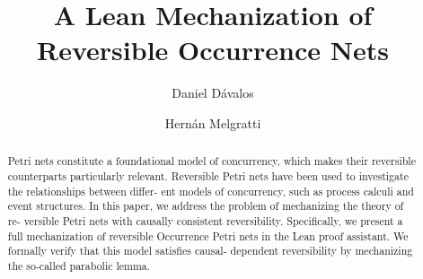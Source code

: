 \documentclass{report}
\title{A Lean Mechanization of Reversible Occurrence Nets}
\author{Daniel Dávalos}
\author{Hernán Melgratti}
\begin{document}
\maketitle

\begin{abstract}
Petri nets constitute a foundational model of concurrency,
which makes their reversible counterparts particularly relevant. Reversible
Petri nets have been used to investigate the relationships between differ-
ent models of concurrency, such as process calculi and event structures.
In this paper, we address the problem of mechanizing the theory of re-
versible Petri nets with causally consistent reversibility. Specifically, we
present a full mechanization of reversible Occurrence Petri nets in the
Lean proof assistant. We formally verify that this model satisfies causal-
dependent reversibility by mechanizing the so-called parabolic lemma.
\end{abstract}





\end{document}
